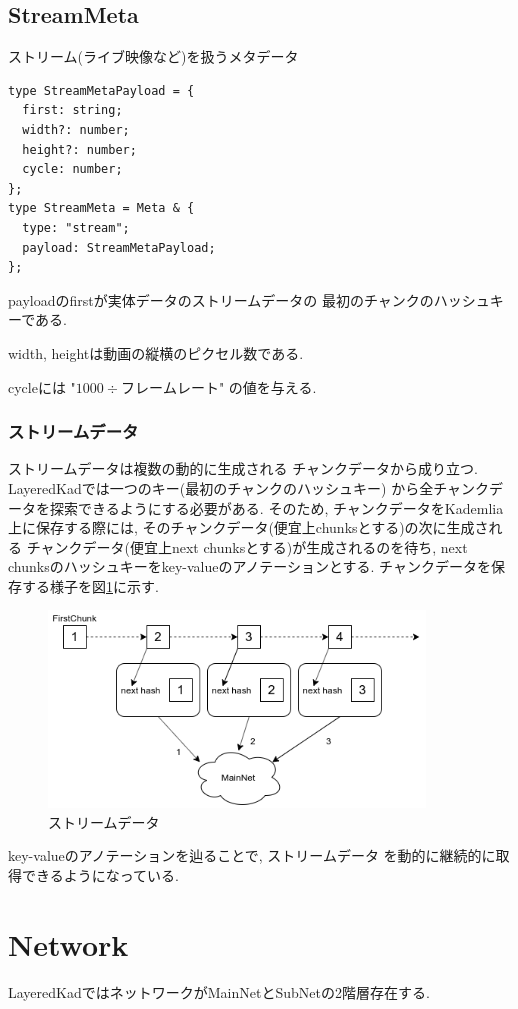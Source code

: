 \documentclass[sotsuron]{jcsie}
\begin{document}
\subsection{StreamMeta}
ストリーム(ライブ映像など)を扱うメタデータ
\begin{lstlisting}
type StreamMetaPayload = {
  first: string;
  width?: number;
  height?: number;
  cycle: number;
};	
type StreamMeta = Meta & {
  type: "stream";
  payload: StreamMetaPayload;
};  
\end{lstlisting}

payloadのfirstが実体データのストリームデータの
最初のチャンクのハッシュキーである.

width, heightは動画の縦横のピクセル数である.

cycleには "$ 1000 \div フレームレート $" の値を与える.

\subsubsection{ストリームデータ}
ストリームデータは複数の動的に生成される
チャンクデータから成り立つ.
LayeredKadでは一つのキー(最初のチャンクのハッシュキー)
から全チャンクデータを探索できるようにする必要がある.
そのため, チャンクデータをKademlia上に保存する際には, 
そのチャンクデータ(便宜上chunksとする)の次に生成される
チャンクデータ(便宜上next chunksとする)が生成されるのを待ち, 
next chunksのハッシュキーをkey-valueのアノテーションとする.
チャンクデータを保存する様子を図\ref{fig:streamdata}に示す.
\begin{figure}[H]
	\centering
	\includegraphics[width=10cm]{./assets/image/stream.png}
	\caption{ストリームデータ}
	\label{fig:streamdata}
\end{figure}

key-valueのアノテーションを辿ることで, ストリームデータ
を動的に継続的に取得できるようになっている.

\section{Network}
LayeredKadではネットワークがMainNetとSubNetの2階層存在する.
\end{document}
